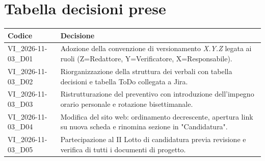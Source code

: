 \section{Tabella decisioni prese}
\renewcommand{\arraystretch}{1.3}
\noindent
\begin{tabularx}{\textwidth}{|l|X|}
    \hline
    \textbf{Codice} & \textbf{Decisione} \\
    \hline
    VI\_2026-11-03\_D01 & Adozione della convenzione di versionamento \textit{X.Y.Z} legata ai ruoli (Z=Redattore, Y=Verificatore, X=Responsabile). \\
    \hline
    VI\_2026-11-03\_D02 & Riorganizzazione della struttura dei verbali con tabella decisioni e tabella ToDo collegata a Jira. \\
    \hline
    VI\_2026-11-03\_D03 & Ristrutturazione del preventivo con introduzione dell'impegno orario personale e rotazione bisettimanale. \\
    \hline
    VI\_2026-11-03\_D04 & Modifica del sito web: ordinamento decrescente, apertura link su nuova scheda e rinomina sezione in "Candidatura". \\
    \hline
    VI\_2026-11-03\_D05 & Partecipazione al II Lotto di candidatura previa revisione e verifica di tutti i documenti di progetto. \\
    \hline
\end{tabularx}
